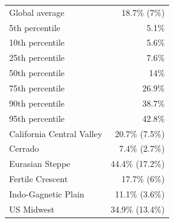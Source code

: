
\begin{tabular}{lr}
\toprule
Global average & 18.7\% (7\%)\\
5th percentile & 5.1\%\\
10th percentile & 5.6\%\\
25th percentile & 7.6\%\\
50th percentile & 14\%\\
\addlinespace
75th percentile & 26.9\%\\
90th percentile & 38.7\%\\
95th percentile & 42.8\%\\
California Central Valley & 20.7\% (7.5\%)\\
Cerrado & 7.4\% (2.7\%)\\
\addlinespace
Eurasian Steppe & 44.4\% (17.2\%)\\
Fertile Crescent & 17.7\% (6\%)\\
Indo-Gagnetic Plain & 11.1\% (3.6\%)\\
US Midwest & 34.9\% (13.4\%)\\
\bottomrule
\end{tabular}
